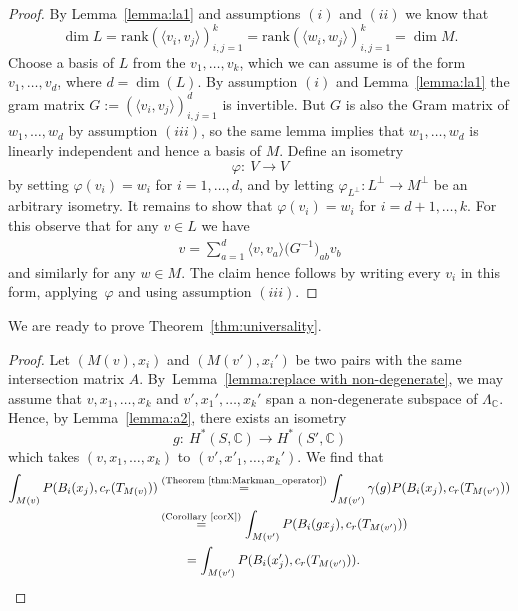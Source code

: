 \documentclass[pdftex]{sigma}
\numberwithin{equation}{section}
\newcommand{\BC}{{\mathbb{C}}}
\newcommand{\1}{\mathsf{1}}
\begin{document}
\begin{proof}
By Lemma~\ref{lemma:la1} and assumptions $(i)$ and $(ii)$ we know that
\[
\dim L = \mathrm{rank} (\langle v_i, v_j \rangle)_{i,j=1}^{k} =
\mathrm{rank} (\langle w_i, w_j \rangle)_{i,j=1}^{k} = \dim M.
\]
Choose a basis of $L$ from the $v_1, \dots, v_k$, which we can assume is of the form $v_1, \dots, v_d$, where $d=\dim(L)$.
By assumption $(i)$ and Lemma~\ref{lemma:la1} the gram matrix $G := (\langle v_i, v_j \rangle )_{i,j=1}^{d}$ is invertible.
But $G$ is also the Gram matrix of $w_1, \dots, w_d$ by assumption $(iii)$,
so the same lemma implies that $w_1, \dots, w_d$ is linearly independent and hence a basis of $M$.
Define an isometry
\[
\varphi \colon\ V \to V
\]
by setting $\varphi(v_i) = w_i$ for $i=1,\dots, d$,
and by letting $\varphi_{L^{\perp}} \colon L^{\perp} \to M^{\perp}$ be an arbitrary isometry.
It remains to show that $\varphi(v_i) = w_i$ for $i=d+1, \dots, k$.
For this observe that for any $v \in L$ we have
\begin{gather*}
v = \sum_{a=1}^{d} \langle v, v_a \rangle \big(G^{-1}\big)_{ab} v_b
\end{gather*}
and similarly for any $w \in M$.
The claim hence follows by writing every $v_i$ in this form, applying~$\varphi$ and using assumption $(iii)$.
\end{proof}

We are ready to prove Theorem~\ref{thm:universality}.
\begin{proof}
Let $(M(v), x_i)$ and $(M(v'), x_i')$ be two pairs with the same intersection matrix $A$.
By~Lemma~\ref{lemma:replace with non-degenerate}, we may assume that $v,x_1, \dots, x_k$ and
$v', x_1', \dots, x_k'$ span a non-degenerate subspace of $\Lambda_{\BC}$.
Hence, by Lemma~\ref{lemma:a2}, there exists an isometry
\[
g \colon\ H^{\ast}(S,\BC) \to H^{\ast}(S', \BC)
\]
which takes $(v, x_1, \dots,x_k)$ to $(v', x'_1, \dots, x_k')$.
We find that
\begin{align*}
\int_{M(v)} P(B_i(x_j), c_r(T_{M(v)}))
& \overset{\textup{(Theorem~\ref{thm:Markman_operator})}}{=} \int_{M(v')} \gamma(g) P(B_i(x_j), c_r(T_{M(v')})) \\
& \overset{\textup{(Corollary~\ref{corX})}}{=}
\int_{M(v')} P( B_i(g x_j), c_r(T_{M(v')})) \\
&\qquad =
\int_{M(v')} P( B_i(x_j'), c_r(T_{M(v')})).\tag*{\qed}
\end{align*}
\renewcommand{\qed}{}
\end{proof}
\end{document}
